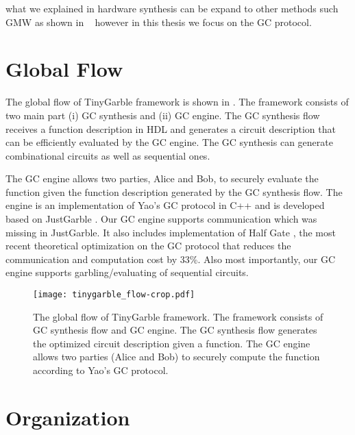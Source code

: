 what we explained in hardware synthesis can be expand to other methods such GMW as shown in ~\cite{demmler2015automated} however in this thesis we focus on the GC protocol.

\section{Global Flow}
The global flow of TinyGarble framework is shown in .
The framework consists of two main part (i) GC synthesis and (ii) GC engine.
The GC synthesis flow receives a function description in HDL and generates a circuit description that can be efficiently evaluated by the GC engine.
The GC synthesis can generate combinational circuits as well as sequential ones.

The GC engine allows two parties, Alice and Bob, to securely evaluate the function given the function description generated by the GC synthesis flow.
The engine is an implementation of Yao's GC protocol in C++ and is developed based on JustGarble \cite{bellare2013efficient}.
Our GC engine supports communication which was missing in JustGarble.
It also includes implementation of Half Gate \cite{zahur2015two}, the most recent theoretical optimization on the GC protocol that reduces the communication and computation cost by 33\%.
Also most importantly, our GC engine supports garbling/evaluating of sequential circuits.

\begin{figure}[ht]
\centering
\texttt{[image: tinygarble\_flow-crop.pdf]}
\caption{The global flow of TinyGarble framework.
The framework consists of GC synthesis flow and GC engine.
The GC synthesis flow generates the optimized circuit description given a function.
The GC engine allows two parties (Alice and Bob) to securely compute the function according to Yao's GC protocol.
}
\label{fig:globalflow}
\end{figure}

\section{Organization}
